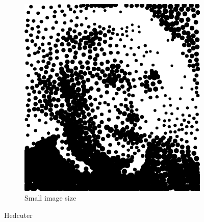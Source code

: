 \documentclass[11pt]{article}
\begin{document}
\begin{enumerate}
\begin{figure}[H]
\begin{subfigure}{0.4\textwidth}
        \includegraphics[width=\textwidth]{../results/hedcuter/3-6.pdf}
         \caption{Small image size}
    \end{subfigure}
    \label{fig:1}
        \caption{Hedcuter}
\end{figure}


\end{enumerate}
\end{document}
